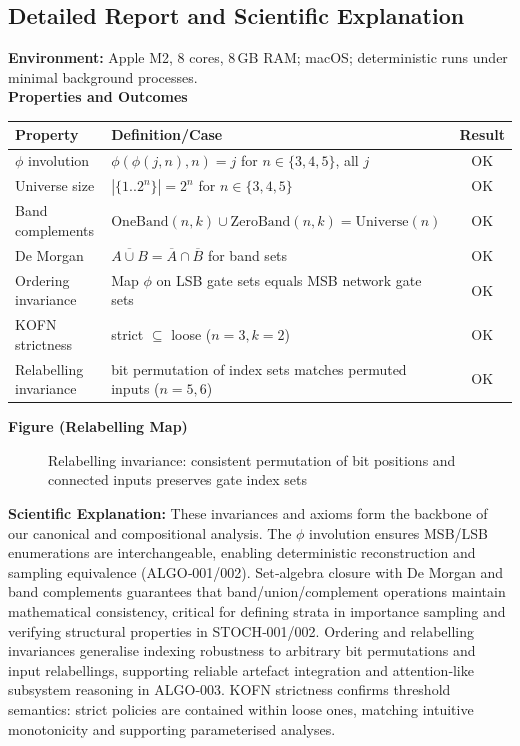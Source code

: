 \documentclass[11pt]{article}
\begin{document}
\subsection*{Detailed Report and Scientific Explanation}
\textbf{Environment:} Apple M2, 8 cores, 8\,GB RAM; macOS; deterministic runs under minimal background processes.\\
\textbf{Properties and Outcomes}
\begin{center}
\begin{tabular}{llc}
\toprule
Property & Definition/Case & Result \\
\midrule
$\phi$ involution & $\phi(\phi(j,n),n)=j$ for $n\in\{3,4,5\}$, all $j$ & OK \\
Universe size & $|\{1..2^n\}|=2^n$ for $n\in\{3,4,5\}$ & OK \\
Band complements & $\mathrm{OneBand}(n,k)\cup\mathrm{ZeroBand}(n,k)=\mathrm{Universe}(n)$ & OK \\
De Morgan & $\overline{A\cup B}=\overline{A}\cap\overline{B}$ for band sets & OK \\
Ordering invariance & Map $\phi$ on LSB gate sets equals MSB network gate sets & OK \\
KOFN strictness & strict $\subseteq$ loose ($n=3, k=2$) & OK \\
Relabelling invariance & bit permutation of index sets matches permuted inputs ($n=5,6$) & OK \\
\bottomrule
\end{tabular}
\end{center}
\textbf{Figure (Relabelling Map)}
\begin{figure}[h]
\centering
{}
\caption{Relabelling invariance: consistent permutation of bit positions and connected inputs preserves gate index sets}
\end{figure}
\textbf{Scientific Explanation:} These invariances and axioms form the backbone of our canonical and compositional analysis. The $\phi$ involution ensures MSB/LSB enumerations are interchangeable, enabling deterministic reconstruction and sampling equivalence (ALGO‑001/002). Set‑algebra closure with De Morgan and band complements guarantees that band/union/complement operations maintain mathematical consistency, critical for defining strata in importance sampling and verifying structural properties in STOCH‑001/002. Ordering and relabelling invariances generalise indexing robustness to arbitrary bit permutations and input relabellings, supporting reliable artefact integration and attention‑like subsystem reasoning in ALGO‑003. KOFN strictness confirms threshold semantics: strict policies are contained within loose ones, matching intuitive monotonicity and supporting parameterised analyses.
\end{document}
